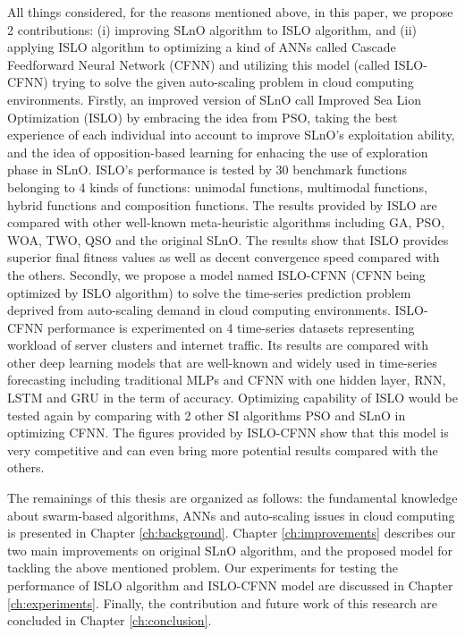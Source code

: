 \documentclass[../main.tex]{subfiles}
\begin{document}
	All things considered, for the reasons mentioned above, in this paper, we propose 2 contributions: (i) improving SLnO algorithm to ISLO algorithm, and (ii) applying ISLO algorithm to optimizing a kind of ANNs called Cascade Feedforward Neural Network (CFNN) and utilizing this model (called ISLO-CFNN) trying to solve the given auto-scaling problem in cloud computing environments. Firstly, an improved version of SLnO call Improved Sea Lion Optimization (ISLO) by embracing the idea from PSO, taking the best experience of each individual into account to improve SLnO's exploitation ability, and the idea of opposition-based learning for enhacing the use of exploration phase in SLnO. ISLO's performance is tested by 30 benchmark functions belonging to 4 kinds of functions: unimodal functions, multimodal functions, hybrid functions and composition functions. The results provided by ISLO are compared with other well-known meta-heuristic algorithms including GA, PSO, WOA, TWO, QSO and the original SLnO. The results show that ISLO provides superior final fitness values as well as decent convergence speed compared with the others. Secondly, we propose a model named ISLO-CFNN (CFNN being optimized by ISLO algorithm) to solve the time-series prediction problem deprived from  auto-scaling demand in cloud computing environments. ISLO-CFNN performance is experimented on 4 time-series datasets representing workload of server clusters and internet traffic. Its results are compared with other deep learning models that are well-known and widely used in time-series forecasting including traditional MLPs and CFNN with one hidden layer, RNN, LSTM and GRU in the term of accuracy. Optimizing capability of ISLO would be tested again by comparing with 2 other SI algorithms PSO and SLnO in optimizing CFNN. The figures provided by ISLO-CFNN show that this model is very competitive and can even bring more potential results compared with the others.
	
	The remainings of this thesis are organized as follows: the fundamental knowledge about swarm-based algorithms, ANNs and auto-scaling issues in cloud computing is presented in Chapter \ref{ch:background}. Chapter \ref{ch:improvements} describes our two main improvements on original SLnO algorithm, and the proposed model for tackling the above mentioned problem. Our experiments for testing the performance of ISLO algorithm and ISLO-CFNN model are discussed in Chapter \ref{ch:experiments}. Finally, the contribution and future work of this research are concluded in Chapter \ref{ch:conclusion}. 
\end{document}
